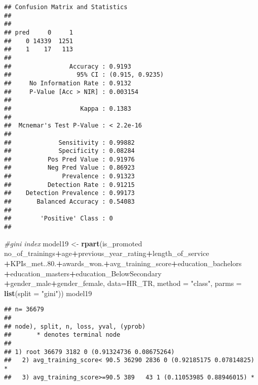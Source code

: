 \documentclass[
]{article}
\newenvironment{Shaded}{\begin{snugshade}}{\end{snugshade}}
\newcommand{\CommentTok}[1]{\textcolor[rgb]{0.56,0.35,0.01}{\textit{#1}}}
\newcommand{\DataTypeTok}[1]{\textcolor[rgb]{0.13,0.29,0.53}{#1}}
\newcommand{\FloatTok}[1]{\textcolor[rgb]{0.00,0.00,0.81}{#1}}
\newcommand{\KeywordTok}[1]{\textcolor[rgb]{0.13,0.29,0.53}{\textbf{#1}}}
\newcommand{\NormalTok}[1]{#1}
\newcommand{\OperatorTok}[1]{\textcolor[rgb]{0.81,0.36,0.00}{\textbf{#1}}}
\newcommand{\StringTok}[1]{\textcolor[rgb]{0.31,0.60,0.02}{#1}}
\begin{document}
\begin{verbatim}
## Confusion Matrix and Statistics
## 
##     
## pred     0     1
##    0 14339  1251
##    1    17   113
##                                          
##                Accuracy : 0.9193         
##                  95% CI : (0.915, 0.9235)
##     No Information Rate : 0.9132         
##     P-Value [Acc > NIR] : 0.003154       
##                                          
##                   Kappa : 0.1383         
##                                          
##  Mcnemar's Test P-Value : < 2.2e-16      
##                                          
##             Sensitivity : 0.99882        
##             Specificity : 0.08284        
##          Pos Pred Value : 0.91976        
##          Neg Pred Value : 0.86923        
##              Prevalence : 0.91323        
##          Detection Rate : 0.91215        
##    Detection Prevalence : 0.99173        
##       Balanced Accuracy : 0.54083        
##                                          
##        'Positive' Class : 0              
## 
\end{verbatim}

\begin{Shaded}
\begin{Highlighting}[]
\CommentTok{#gini index}
\NormalTok{model19 <-}\StringTok{ }\KeywordTok{rpart}\NormalTok{(is_promoted }\OperatorTok{~}\StringTok{ }\NormalTok{no_of_trainings}\OperatorTok{+}\NormalTok{age}\OperatorTok{+}\NormalTok{previous_year_rating}\OperatorTok{+}\NormalTok{length_of_service}
                 \OperatorTok{+}\NormalTok{KPIs_met..}\FloatTok{80.}\OperatorTok{+}\NormalTok{awards_won.}\OperatorTok{+}\NormalTok{avg_training_score}\OperatorTok{+}\NormalTok{education_bachelors}
                 \OperatorTok{+}\NormalTok{education_masters}\OperatorTok{+}\NormalTok{education_BelowSecondary}
                 \OperatorTok{+}\NormalTok{gender_male}\OperatorTok{+}\NormalTok{gender_female,  }
                 \DataTypeTok{data=}\NormalTok{HR_TR, }
                 \DataTypeTok{method =} \StringTok{"class"}\NormalTok{,}
                 \DataTypeTok{parms =} \KeywordTok{list}\NormalTok{(}\DataTypeTok{split =} \StringTok{"gini"}\NormalTok{))}
\NormalTok{model19}
\end{Highlighting}
\end{Shaded}

\begin{verbatim}
## n= 36679 
## 
## node), split, n, loss, yval, (yprob)
##       * denotes terminal node
## 
## 1) root 36679 3182 0 (0.91324736 0.08675264)  
##   2) avg_training_score< 90.5 36290 2836 0 (0.92185175 0.07814825) *
##   3) avg_training_score>=90.5 389   43 1 (0.11053985 0.88946015) *
\end{verbatim}
\end{document}
